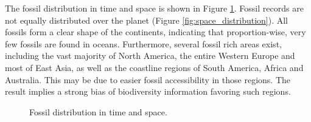 \documentclass[11pt, a4paper,oneside,chapterprefix=false]{scrbook}
\begin{document}
The fossil distribution in time and space is shown in Figure \ref{fig:distribution}. Fossil records are not equally distributed over the planet (Figure \ref{fig:space_distribution}). All fossils form a clear shape of the continents, indicating that proportion-wise, very few fossils are found in oceans. Furthermore, several fossil rich areas exist, including the vast majority of North America, the entire Western Europe and most of East Asia, as well as the coastline regions of South America, Africa and Australia. This may be due to easier fossil accessibility in those regions. The result implies a strong bias of biodiversity information favoring such regions. \\

\begin{figure}[h]
	\centering
	\hfill
	\caption{Fossil distribution in time and space.}
	\label{fig:distribution}
\end{figure}
\end{document}
